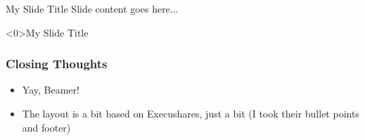 \documentclass[aspectratio=43,10pt]{beamer}
\begin{document}
	\begin{frame}{My Slide Title}
    	Slide content goes here...
	\end{frame}

	\begin{frame}{My Slide Title}
	\end{frame}


	\begin{frame}
		\frametitle{Closing Thoughts}
		\begin{itemize}
			\item Yay, Beamer!
			\item The layout is a bit based on Execushares, just a bit (I took their bullet points and footer)
		\end{itemize}
	\end{frame}

	\appendix
	\backupbegin
	\backupend
\end{document}
